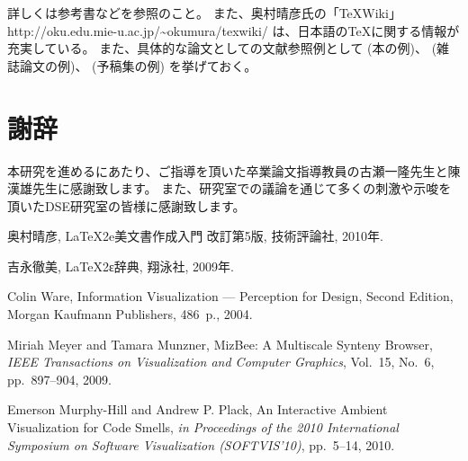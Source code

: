 \documentclass[a4paper,11pt]{jreport}
\begin{document}
詳しくは参考書\cite{okumura2010,yoshinaga2009}などを参照のこと。
また、奥村晴彦氏の「\TeX Wiki」
http://oku.edu.mie-u.ac.jp/\textasciitilde{}okumura/texwiki/
は、日本語の\TeX に関する情報が充実している。
また、具体的な論文としての文献参照例として
(本の例)\cite{ware2004}、
(雑誌論文の例)\cite{meyer2009}、
(予稿集の例)\cite{hill2010}
を挙げておく。

\chapter*{謝辞}

本研究を進めるにあたり、ご指導を頂いた卒業論文指導教員の古瀬一隆先生と陳漢雄先生に感謝致します。
また、研究室での議論を通じて多くの刺激や示唆を頂いたDSE研究室の皆様に感謝致します。

\newpage


\renewcommand{\bibname}{参考文献}

%
%

\begin{thebibliography}{1}
奥村晴彦, LaTeX2e美文書作成入門 改訂第5版, 技術評論社, 2010年.

吉永徹美, LaTeX2ε辞典, 翔泳社, 2009年.

Colin Ware, Information Visualization --- Perception for Design, Second Edition, Morgan Kaufmann Publishers, 486~p., 2004.

Miriah Meyer and Tamara Munzner, MizBee: A Multiscale Synteny Browser, {\em IEEE Transactions on Visualization and Computer Graphics}, Vol.~15, No.~6, pp.~897--904, 2009.

Emerson Murphy-Hill and Andrew P. Plack, An Interactive Ambient Visualization for Code Smells, {\em in Proceedings of the 2010 International Symposium on Software Visualization (SOFTVIS’10)}, pp.~5--14, 2010.

\end{thebibliography}
\end{document}
